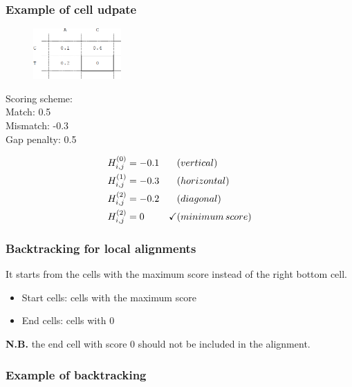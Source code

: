 \subsubsection*{Example of cell udpate}
\begin{multicols}{2}
\begin{figure}[H]
  \centering
      \includegraphics[width=0.3\textwidth]{fig04/local_alignment_cell_update.png}
\end{figure}

\noindent Scoring scheme: \\ 
\null \quad Match: 0.5 \\ 
\null \quad Mismatch: -0.3 \\ 
\null \quad Gap penalty: 0.5

\end{multicols} 

\begin{align*}
H_{i,j}^{(0)} &=  -0.1 &\hfill &(vertical) \\
H_{i,j}^{(1)} &= -0.3 &\hfill &(horizontal) \\
H_{i,j}^{(2)} &= -0.2 &\hfill &(diagonal) \\
H_{i,j}^{(2)} &= 0 & \checkmark &(minimum \, score)
\end{align*}
\medskip 

%
%
\subsubsection*{Backtracking for local alignments}
It starts from the cells with the maximum score instead of the right bottom cell.

\begin{itemize}
\item Start cells: cells with the maximum score 
\item End cells: cells with 0
\end{itemize}

\noindent
\textbf{N.B.} the end cell with score 0 should not be included in the alignment.

%
%
\subsubsection*{Example of backtracking}

